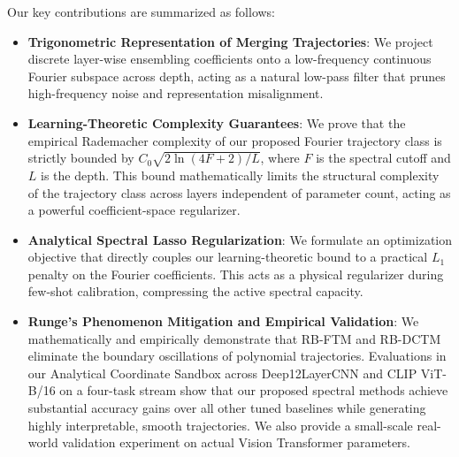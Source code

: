 Our key contributions are summarized as follows:
\begin{itemize}
    \item \textbf{Trigonometric Representation of Merging Trajectories}: We project discrete layer-wise ensembling coefficients onto a low-frequency continuous Fourier subspace across depth, acting as a natural low-pass filter that prunes high-frequency noise and representation misalignment.
    \item \textbf{Learning-Theoretic Complexity Guarantees}: We prove that the empirical Rademacher complexity of our proposed Fourier trajectory class is strictly bounded by $C_0 \sqrt{2 \ln(4F+2) / L}$, where $F$ is the spectral cutoff and $L$ is the depth. This bound mathematically limits the structural complexity of the trajectory class across layers independent of parameter count, acting as a powerful coefficient-space regularizer.
    \item \textbf{Analytical Spectral Lasso Regularization}: We formulate an optimization objective that directly couples our learning-theoretic bound to a practical $L_1$ penalty on the Fourier coefficients. This acts as a physical regularizer during few-shot calibration, compressing the active spectral capacity.
    \item \textbf{Runge's Phenomenon Mitigation and Empirical Validation}: We mathematically and empirically demonstrate that RB-FTM and RB-DCTM eliminate the boundary oscillations of polynomial trajectories. Evaluations in our Analytical Coordinate Sandbox across Deep12LayerCNN and CLIP ViT-B/16 on a four-task stream show that our proposed spectral methods achieve substantial accuracy gains over all other tuned baselines while generating highly interpretable, smooth trajectories. We also provide a small-scale real-world validation experiment on actual Vision Transformer parameters.
\end{itemize}